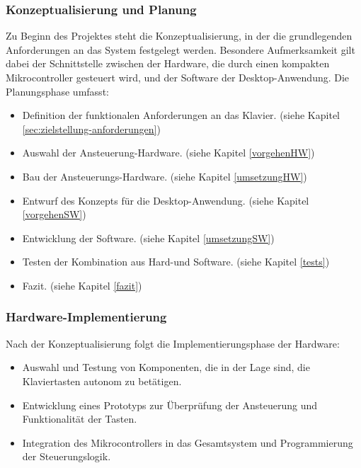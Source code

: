\subsubsection{Konzeptualisierung und Planung}\label{Vorgehensweise - Konzeptualisierung und Planung}

Zu Beginn des Projektes steht die Konzeptualisierung, in der die grundlegenden Anforderungen an das System festgelegt werden.
Besondere Aufmerksamkeit gilt dabei der Schnittstelle zwischen der Hardware, die durch einen kompakten Mikrocontroller gesteuert wird, und der Software der Desktop-Anwendung.
Die Planungsphase umfasst:

\begin{itemize}
    \item Definition der funktionalen Anforderungen an das Klavier. (siehe Kapitel \ref{sec:zielstellung-anforderungen})
    \item Auswahl der Ansteuerung-Hardware. (siehe Kapitel \ref{vorgehenHW})
    \item Bau der Ansteuerungs-Hardware. (siehe Kapitel \ref{umsetzungHW})
    \item Entwurf des Konzepts für die Desktop-Anwendung. (siehe Kapitel \ref{vorgehenSW})
    \item Entwicklung der Software. (siehe Kapitel \ref{umsetzungSW})
    \item Testen der Kombination aus Hard-und Software. (siehe Kapitel \ref{tests})
    \item Fazit. (siehe Kapitel \ref{fazit})
\end{itemize}

\subsubsection{Hardware-Implementierung}\label{Vorgehensweise - Hardware-Implementierung}

Nach der Konzeptualisierung folgt die Implementierungsphase der Hardware:

\begin{itemize}
    \item Auswahl und Testung von Komponenten, die in der Lage sind, die Klaviertasten autonom zu betätigen.
    \item Entwicklung eines Prototyps zur Überprüfung der Ansteuerung und Funktionalität der Tasten.
    \item Integration des Mikrocontrollers in das Gesamtsystem und Programmierung der Steuerungslogik.
\end{itemize}

